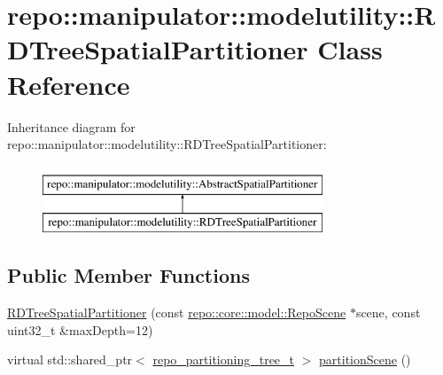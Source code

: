 \hypertarget{classrepo_1_1manipulator_1_1modelutility_1_1_r_d_tree_spatial_partitioner}{}\section{repo\+:\+:manipulator\+:\+:modelutility\+:\+:R\+D\+Tree\+Spatial\+Partitioner Class Reference}
\label{classrepo_1_1manipulator_1_1modelutility_1_1_r_d_tree_spatial_partitioner}
Inheritance diagram for repo\+:\+:manipulator\+:\+:modelutility\+:\+:R\+D\+Tree\+Spatial\+Partitioner\+:\begin{figure}[H]
\begin{center}
\leavevmode
\includegraphics[height=2.000000cm]{classrepo_1_1manipulator_1_1modelutility_1_1_r_d_tree_spatial_partitioner}
\end{center}
\end{figure}
\subsection*{Public Member Functions}
\begin{DoxyCompactItemize}
\item 
\hyperlink{classrepo_1_1manipulator_1_1modelutility_1_1_r_d_tree_spatial_partitioner_a4a6e0cdf7349cb359a867c1aceb709f1}{R\+D\+Tree\+Spatial\+Partitioner} (const \hyperlink{classrepo_1_1core_1_1model_1_1_repo_scene}{repo\+::core\+::model\+::\+Repo\+Scene} $\ast$scene, const uint32\+\_\+t \&max\+Depth=12)
\item 
virtual std\+::shared\+\_\+ptr$<$ \hyperlink{structrepo__partitioning__tree__t}{repo\+\_\+partitioning\+\_\+tree\+\_\+t} $>$ \hyperlink{classrepo_1_1manipulator_1_1modelutility_1_1_r_d_tree_spatial_partitioner_a768852ef54d357e43b86a70897002623}{partition\+Scene} ()
\end{DoxyCompactItemize}
